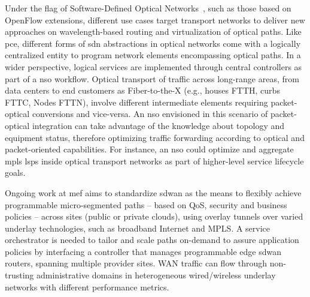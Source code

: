 Under the flag of Software-Defined Optical Networks~\cite{7503119}, such as those based on OpenFlow extensions, different use cases target transport networks to deliver new approaches on wavelength-based routing and virtualization of optical paths.  Like \gls{pce}, different forms of \gls{sdn} abstractions in optical networks come with a logically centralized entity to program network elements encompassing optical paths. In a wider perspective, logical services are implemented through central controllers as part of a \gls{nso} workflow.
Optical transport of traffic across long-range areas, from data centers to end customers as Fiber-to-the-X (e.g., houses FTTH, curbs FTTC, Nodes FTTN), involve different intermediate elements requiring packet-optical conversions and vice-versa. An \gls{nso} envisioned in this scenario of packet-optical integration can take advantage of the knowledge about topology and equipment status, therefore optimizing traffic forwarding according to optical and packet-oriented capabilities. For instance, an \gls{nso} could optimize and aggregate \gls{mpls} \glspl{lsp} inside optical transport networks as part of higher-level service lifecycle goals.

Ongoing work at \gls{mef} aims to standardize \gls{sdwan} \cite{MEF:SDWAN:2017}  as the means to flexibly achieve programmable micro-segmented paths -- based on QoS, security and business policies -- across sites (public or private clouds), using overlay tunnels over varied underlay technologies, such as broadband Internet and MPLS. A service orchestrator is needed to tailor and scale paths on-demand to assure application policies by interfacing a controller that manages programmable edge \gls{sdwan} routers, spanning multiple provider sites. WAN traffic can flow through non-trusting administrative domains in heterogeneous wired/wireless underlay networks with different performance metrics.



